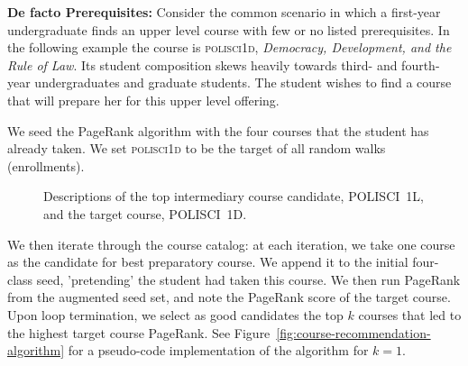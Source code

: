 {\bf De facto Prerequisites:} Consider the common scenario in
which a first-year undergraduate finds an upper
level course with few or no listed prerequisites. In the following
example the course is \textsc{polisci1d}, {\em Democracy, Development, and
  the Rule of Law}. Its student composition skews heavily towards
third- and fourth- year undergraduates and graduate students. The
student wishes to find a course that will prepare her for this upper
level offering.

We seed the PageRank algorithm with the four courses that the student
has already taken. We set \textsc{polisci1d} to be the target of all random
walks (enrollments).

\begin{figure}
    \centering
    \noindent{}
    \noindent{}
    \caption{Descriptions of the top intermediary course candidate,
      POLISCI~1L, and the target course, POLISCI~1D.}
    \label{fig:pr-course-descriptions}
\end{figure}

We then iterate through the course catalog: at each iteration, we take
one course as the candidate for best preparatory course. We append it
to the initial four-class seed, 'pretending' the student had taken
this course. We then run PageRank from the augmented seed set, and
note the PageRank score of the target course. Upon loop termination,
we select as good candidates the top $k$ courses that led to the
highest target course PageRank.  See
Figure~\ref{fig:course-recommendation-algorithm} for a pseudo-code
implementation of the algorithm for $k=1$.

